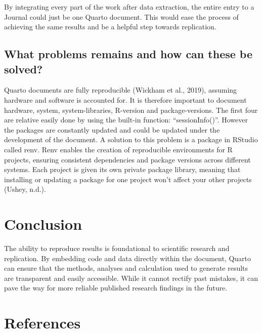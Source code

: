 \documentclass[
  a4paper,
]{article}
\begin{document}
By integrating every part of the work after data extraction, the entire
entry to a Journal could just be one Quarto document. This would ease
the process of achieving the same results and be a helpful step towards
replication.

\subsection{What problems remains and how can these be
solved?}\label{what-problems-remains-and-how-can-these-be-solved}

Quarto documents are fully reproducible (Wickham et al., 2019), assuming
hardware and software is accounted for. It is therefore important to
document hardware, system, system-libraries, R-version and
package-versions. The first four are relative easily done by using the
built-in function: ``sessionInfo()''. However the packages are
constantly updated and could be updated under the development of the
document. A solution to this problem is a package in RStudio called
renv. Renv enables the creation of reproducible environments for R
projects, ensuring consistent dependencies and package versions across
different systems. Each project is given its own private package
library, meaning that installing or updating a package for one project
won't affect your other projects (Ushey, n.d.).

\section{Conclusion}\label{conclusion}

The ability to reproduce results is foundational to scientific research
and replication. By embedding code and data directly within the
document, Quarto can ensure that the methods, analyses and calculation
used to generate results are transparent and easily accessible. While it
cannot rectify past mistakes, it can pave the way for more reliable
published research findings in the future.

\section*{References}\label{references}
\end{document}
